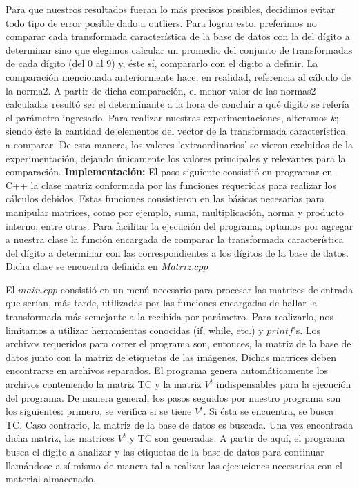 \documentclass[10pt, a4paper]{article}
\begin{document}
Para que nuestros resultados fueran lo más precisos posibles, decidimos evitar todo tipo de error posible dado a outliers. Para lograr esto, preferimos no comparar cada transformada característica de la base de datos con la del dígito a determinar sino que elegimos calcular un promedio del conjunto de transformadas de cada dígito (del 0 al 9) y, éste sí, compararlo con el dígito a definir. La comparación mencionada anteriormente hace, en realidad, referencia al cálculo de la norma2. A partir de dicha comparación, el menor valor de las normas2 calculadas resultó ser el determinante a la hora de concluir a qué dígito se refería el parámetro ingresado.\newline
\newline
Para realizar nuestras experimentaciones, alteramos $k$; siendo éste la cantidad de elementos del vector de la transformada característica a comparar. De esta manera, los valores 'extraordinarios' se vieron excluidos de la experimentación, dejando únicamente los valores principales y relevantes para la comparación. \newline
\newline
\large{\textbf{Implementaci\'on:}}
El paso siguiente consistió en programar en C++ la clase matriz conformada por las funciones requeridas para realizar los cálculos debidos. Estas funciones consistieron en las básicas necesarias para manipular matrices, como por ejemplo, suma, multiplicación, norma y producto interno, entre otras. Para facilitar la ejecución del programa, optamos por agregar a nuestra clase la función encargada de comparar la transformada característica del dígito a determinar con las correspondientes a los dígitos de la base de datos. Dicha clase se encuentra definida en $Matriz.cpp$\newline
 
El $main.cpp$ consisti\'o en un men\'u necesario para procesar las matrices de entrada que ser\'ian, m\'as tarde, utilizadas por las funciones encargadas de hallar la transformada más semejante a la recibida por parámetro. Para realizarlo, nos limitamos a utilizar herramientas conocidas (if, while, etc.) y $printf$'s. Los archivos requeridos para correr el programa son, entonces, la matriz de la base de datos junto con la matriz de etiquetas de las imágenes. Dichas matrices deben encontrarse en archivos separados. El programa genera automáticamente los archivos conteniendo la matriz TC y la matriz $V^t$ indispensables para la ejecución del programa. De manera general, los pasos seguidos por nuestro programa son los siguientes: primero, se verifica si se tiene $V^t$. Si ésta se encuentra, se busca TC. Caso contrario, la matriz de la base de datos es buscada. Una vez encontrada dicha matriz, las matrices $V^t$ y TC son generadas. A partir de aquí, el programa busca el dígito a analizar y las etiquetas de la base de datos para continuar llamándose a sí mismo de manera tal a realizar las ejecuciones necesarias con el material almacenado.\newline
\end{document}
